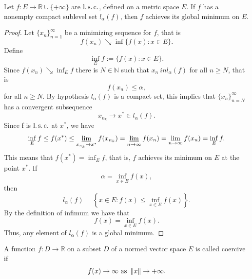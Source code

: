     \begin{theorem} \label{thm2.41}
        Let $f : E \to \mathbb{R} \cup \{+ \infty\}$ are $\operatorname{l.s.c.}$, 
        defined on a metric space $E$. If $f$ has a nonempty compact sublevel
        set $l_{\alpha}(f)$, then $f$ achieves its global minimum on $E$. 
    \end{theorem}
    \begin{proof}
        Let $\{x_n\}_{n = 1}^{\infty}$ be a minimizing sequence for $f$, that is
        $$
            f(x_n) \searrow \inf\{f(x) : x \in E \}.
        $$
        Define 
        $$
            \inf_{E} f := \{ f(x) : x \in E \} .
        $$
        Since $f(x_n) \searrow \inf_{E} f $ there is $N \in \mathbb{N}$ such that
        $x_n \ in l_{\alpha}(f)$ for all $n \geq N$, that is
        $$
            f(x_n) \leq \alpha ,
        $$
        for all $n \geq N$. By hypothesis $l_{\alpha}(f)$ is a compact set, this implies
        that $\{x_n\}_{n=N}^{\infty}$ has a convergent subsequence
        $$
            x_{n_k} \to x^{*} \in l_{\alpha}(f).
        $$
        Since f is $\operatorname{l.s.c.}$ at $x^{*}$, we have 
        $$
            \inf_{E} f \leq f(x^*) \leq \varliminf_{x_{n_k} \to x^{*}} f(x_{n_k}) %
            = \varliminf_{n \to \infty} f(x_n) = \lim_{n \to \infty} f(x_n) = \inf_{E} f.
        $$
        This means that $f(x^{*}) = \inf_{E} f$, that is, $f$ achieves its minimum
        on $E$ at the point $x^{*}$. If 
        $$
            \alpha = \inf_{x \in E} f(x),
        $$
        then
        $$
            l_{\alpha}(f) = \left\{ x \in E : f(x) \leq \inf_{x \in E} f(x) \right\}.
        $$
        By the definition of infimum we have that 
        $$
            f(x) = \inf_{x \in E} f(x).
        $$
        Thus, any element of $l_{\alpha}(f)$ is a global minimum. 
    \end{proof}

    \begin{definition}
        A function $f : D \to \mathbb{R}$ on a subset $D$ of a normed vector space $E$
        is called coercive if 
        $$
            f(x) \to \infty \text{ as } \left\lVert x\right\rVert \to + \infty.
        $$
    \end{definition}
    
